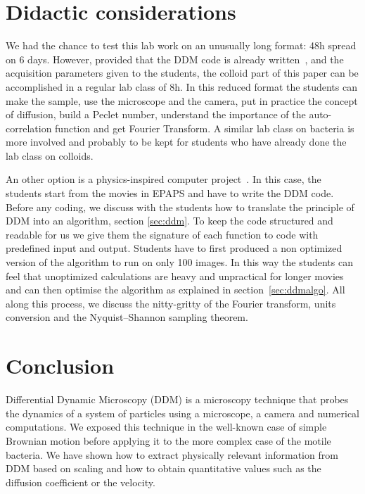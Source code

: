 \documentclass[prb,twocolumn,amsmath,amssymb]{revtex4-1}
\begin{document}
\section{\label{sec:didac}Didactic considerations}
We had the chance to test this lab work on an unusually long format: 48h spread on 6 days. However, provided that the DDM code is already written~\cite{code_github}, and the acquisition parameters given to the students, the colloid part of this paper can be accomplished in a regular lab class of 8h. In this reduced format the students can make the sample, use the microscope and the camera, put in practice the concept of diffusion, build a Peclet number, understand the importance of the auto-correlation function and get Fourier Transform. A similar lab class on bacteria is more involved and probably to be kept for students who have already done the lab class on colloids.

An other option is a physics-inspired computer project~\cite{ajp2005spencer, ajp2014deutsh}. In this case, the students start from the movies in EPAPS and have to write the DDM code. Before any coding, we discuss with the students how to translate the principle of DDM into an algorithm, section \ref{sec:ddm}. To keep the code structured and readable for us we give them the signature of each function to code with predefined input and output. Students have to first produced a non optimized version of the algorithm to run on only 100 images. In this way the students can feel that unoptimized  calculations are heavy and unpractical for longer movies and can then optimise the algorithm as explained in section~\ref{sec:ddmalgo}. All along this process, we discuss the nitty-gritty of the Fourier transform, units conversion and the Nyquist–Shannon sampling theorem.

\section{\label{sec:cl}Conclusion}

Differential Dynamic Microscopy (DDM) is a microscopy technique that probes the dynamics of a system of particles using a microscope, a camera and numerical computations. We exposed this technique in the well-known case of simple Brownian motion before applying it to the more complex case of the motile bacteria. We have shown how to extract physically relevant information from DDM based on scaling and how to obtain quantitative values such as the diffusion coefficient or the velocity.
\end{document}
